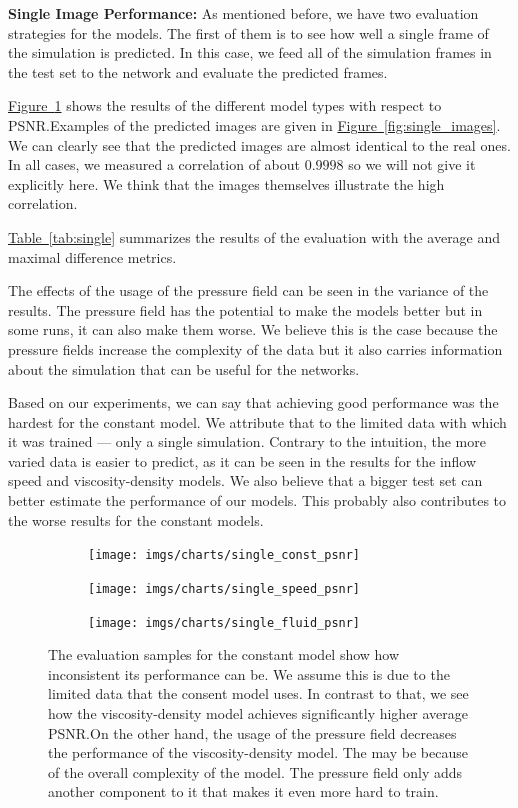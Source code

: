\documentclass{llncs}
\newcommand{\reffig}[1]{\hyperref[#1]{Figure~\ref*{#1}}}
\newcommand{\reftab}[1]{\hyperref[#1]{Table~\ref*{#1}}}
\begin{document}
\noindent\textbf{Single Image Performance:}
As mentioned before, we have two evaluation strategies for the models. The first of them is to see how well a single frame of the simulation is predicted. In this case, we feed all of the simulation frames in the test set to the network and evaluate the predicted frames.

\reffig{fig:single_psnr} shows the results of the different model types with respect to PSNR.\@ Examples of the predicted images are given in \reffig{fig:single_images}. We can clearly see that the predicted images are almost identical to the real ones. In all cases, we measured a correlation of about $0.9998$ so we will not give it explicitly here. We think that the images themselves illustrate the high correlation.

\reftab{tab:single} summarizes the results of the evaluation with the average and maximal difference metrics.

The effects of the usage of the pressure field can be seen in the variance of the results. The pressure field has the potential to make the models better but in some runs, it can also make them worse. We believe this is the case because the pressure fields increase the complexity of the data but it also carries information about the simulation that can be useful for the networks.

Based on our experiments, we can say that achieving good performance was the hardest for the constant model. We attribute that to the limited data with which it was trained --- only a single simulation. Contrary to the intuition, the more varied data is easier to predict, as it can be seen in the results for the inflow speed and viscosity-density models. We also believe that a bigger test set can better estimate the performance of our models. This probably also contributes to the worse results for the constant models.

\begin{figure}
  \begin{subfigure}{.3\textwidth}
    \centering
    \texttt{[image: imgs/charts/single\_const\_psnr]}
  \end{subfigure}
  \begin{subfigure}{.3\textwidth}
    \centering
    \texttt{[image: imgs/charts/single\_speed\_psnr]}
  \end{subfigure}
  \begin{subfigure}{.3\textwidth}
    \centering
    \texttt{[image: imgs/charts/single\_fluid\_psnr]}
  \end{subfigure}
  \caption{The evaluation samples for the constant model show how inconsistent its performance can be. We assume this is due to the limited data that the consent model uses. In contrast to that, we see how the viscosity-density model achieves significantly higher average PSNR.\@ On the other hand, the usage of the pressure field decreases the performance of the viscosity-density model. The may be because of the overall complexity of the model. The pressure field only adds another component to it that makes it even more hard to train.}\label{fig:single_psnr}
\end{figure}
\end{document}

